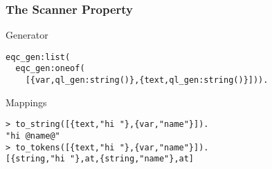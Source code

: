 \begin{frame}[fragile]
  \frametitle{The Scanner Property}

  \begin{block}{Generator}
\begin{verbatim}
eqc_gen:list(
  eqc_gen:oneof(
    [{var,ql_gen:string()},{text,ql_gen:string()}])).
\end{verbatim}
  \end{block}

  \begin{exampleblock}{Mappings}
\begin{verbatim}
> to_string([{text,"hi "},{var,"name"}]).
"hi @name@"
> to_tokens([{text,"hi "},{var,"name"}]).
[{string,"hi "},at,{string,"name"},at]
\end{verbatim}
  \end{exampleblock}
\end{frame}

